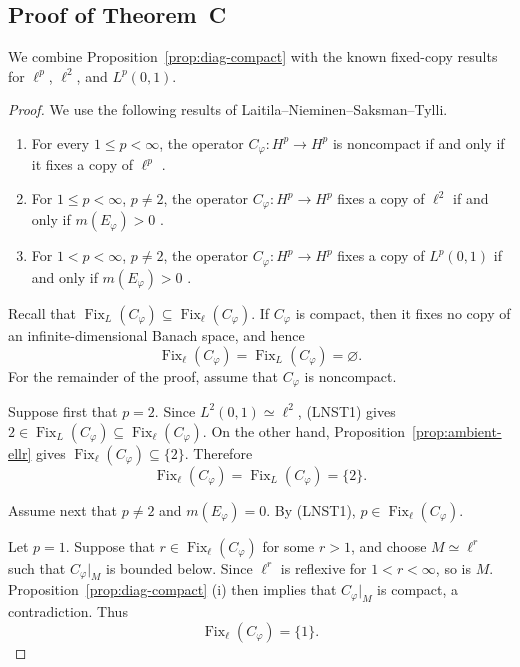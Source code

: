 \documentclass[10pt,a4paper]{amsart}
\begin{document}
\subsection{Proof of Theorem~C}

We combine
Proposition~\ref{prop:diag-compact}
with the known fixed-copy results for \(\ell^p\), \(\ell^2\), and
\(L^p(0,1)\).

\begin{proof}
We use the following results of
Laitila--Nieminen--Saksman--Tylli.
\begin{enumerate}[label=\textup{(LNST\arabic*)},leftmargin=*]
\item For every \(1\le p<\infty\), the operator
\(C_\varphi:H^p\to H^p\) is noncompact if and only if it fixes a
copy of \(\ell^p\)
\cite[Theorem~1.2]{LNST2017}.

\item For \(1\le p<\infty\), \(p\ne2\), the operator
\(C_\varphi:H^p\to H^p\) fixes a copy of \(\ell^2\) if and only if
\(m(E_\varphi)>0\)
\cite[Theorem~1.4]{LNST2017}.

\item For \(1<p<\infty\), \(p\ne2\), the operator
\(C_\varphi:H^p\to H^p\) fixes a copy of \(L^p(0,1)\) if and only if
\(m(E_\varphi)>0\)
\cite[Theorem~1.5]{LNST2017}.
\end{enumerate}

Recall that
\(\operatorname{Fix}_{L}(C_\varphi)
\subseteq\operatorname{Fix}_{\ell}(C_\varphi)\).
If \(C_\varphi\) is compact, then it fixes no copy of an
infinite-dimensional Banach space, and hence
\[
        \operatorname{Fix}_{\ell}(C_\varphi)
        =
        \operatorname{Fix}_{L}(C_\varphi)
        =
        \varnothing.
\]
For the remainder of the proof, assume that \(C_\varphi\) is
noncompact.

Suppose first that \(p=2\). Since
\(L^2(0,1)\simeq\ell^2\), \textup{(LNST1)} gives
\(2\in\operatorname{Fix}_{L}(C_\varphi)
\subseteq\operatorname{Fix}_{\ell}(C_\varphi)\).
On the other hand,
Proposition~\ref{prop:ambient-ellr} gives
\(\operatorname{Fix}_{\ell}(C_\varphi)\subseteq\{2\}\).
Therefore
\[
        \operatorname{Fix}_{\ell}(C_\varphi)
        =
        \operatorname{Fix}_{L}(C_\varphi)
        =
        \{2\}.
\]

Assume next that \(p\ne2\) and \(m(E_\varphi)=0\).
By \textup{(LNST1)},
\(p\in\operatorname{Fix}_{\ell}(C_\varphi)\).

Let \(p=1\). Suppose that
\(r\in\operatorname{Fix}_{\ell}(C_\varphi)\) for some \(r>1\),
and choose \(M\simeq\ell^r\) such that \(C_\varphi|_M\) is bounded
below. Since \(\ell^r\) is reflexive for \(1<r<\infty\), so is \(M\).
Proposition~\ref{prop:diag-compact}%
\textup{(i)} then implies that \(C_\varphi|_M\) is compact, a
contradiction. Thus
\[
        \operatorname{Fix}_{\ell}(C_\varphi)=\{1\}.
\]


\end{proof}
\end{document}
